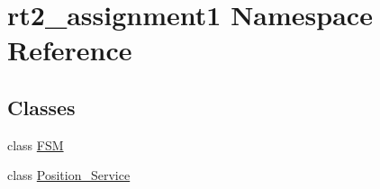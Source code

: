 \hypertarget{namespacert2__assignment1}{}\section{rt2\+\_\+assignment1 Namespace Reference}
\label{namespacert2__assignment1}
\subsection*{Classes}
\begin{DoxyCompactItemize}
\item 
class \hyperlink{classrt2__assignment1_1_1_f_s_m}{F\+SM}
\item 
class \hyperlink{classrt2__assignment1_1_1_position___service}{Position\+\_\+\+Service}
\end{DoxyCompactItemize}
